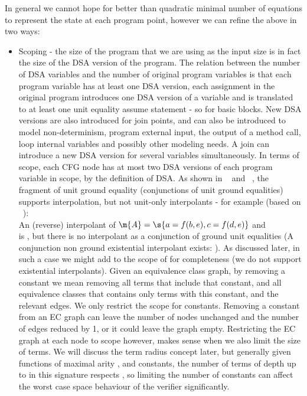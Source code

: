 In general we cannot hope for better than quadratic minimal number of equations to represent the state at each program point, however we can refine the above in two ways:
\begin{itemize}
	\item Scoping - the size of the program that we are using as the input size is in fact the size of the DSA version of the program.
	The relation between the number of DSA variables  and the number of original program variables  is that each program variable has at least one DSA version, each assignment in the original program introduces one DSA version of a variable and is translated to at least one unit equality assume statement - so   for  basic blocks. 
	New DSA versions are also introduced for join points, and can also be introduced to model non-determinism, program external input, the output of a method call, loop internal variables and possibly other modeling needs. A join can introduce a new DSA version for several variables simultaneously.
	In terms of scope, each CFG node has at most two DSA versions of each program variable in scope, by the definition of DSA.
	As shown in ~\cite{McMillan05} and ~\cite{FuchsGoelGrundyKrsticTinelli2012}, the fragment of unit ground equality (conjunctions of unit ground equalities) supports interpolation, but not unit-only interpolants - for example (based on ~\cite{FuchsGoelGrundyKrsticTinelli2012}):\\
	An (reverse) interpolant of $\m{A}=\s{a=f(b,e) , c=f(d,e)}$ and \\
	 is , but there is no interpolant as a conjunction of ground unit equalities (A conjunction non ground existential interpolant exists: ).
	As discussed later, in such a case we might add  to the scope of  for completeness (we do not support existential interpolants).
	Given an equivalence class graph, by removing a constant we mean removing all terms that include that constant, and all equivalence classes that contains only terms with this constant, and the relevant edges.
	We only restrict the scope for constants. Removing a constant from an EC graph can leave the number of nodes unchanged and the number of edges reduced by 1, or it could leave the graph empty. Restricting the EC graph at each node to scope however, makes sense when we also limit the size of terms. We will discuss the term radius concept later, but generally given  functions of maximal arity , and  constants, the number of terms  of depth up to  in this signature respects , so limiting the number of constants can affect the worst case space behaviour of the verifier significantly.
\end{itemize}

